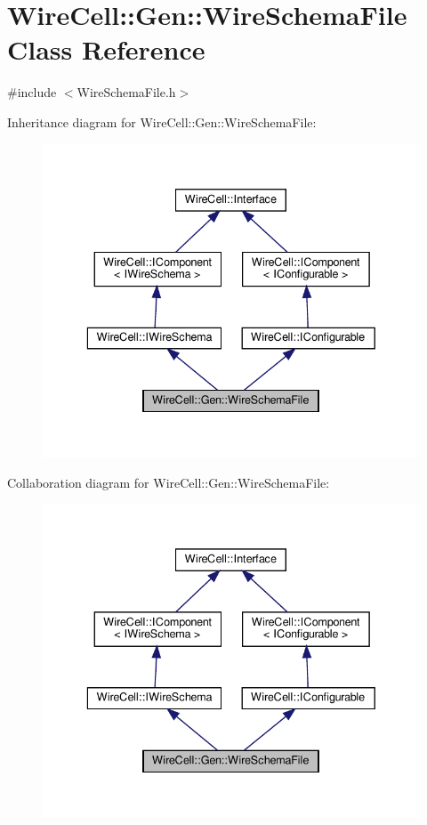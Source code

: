 \hypertarget{class_wire_cell_1_1_gen_1_1_wire_schema_file}{}\section{Wire\+Cell\+:\+:Gen\+:\+:Wire\+Schema\+File Class Reference}
\label{class_wire_cell_1_1_gen_1_1_wire_schema_file}


{\ttfamily \#include $<$Wire\+Schema\+File.\+h$>$}



Inheritance diagram for Wire\+Cell\+:\+:Gen\+:\+:Wire\+Schema\+File\+:
\nopagebreak
\begin{figure}[H]
\begin{center}
\leavevmode
\includegraphics[width=336pt]{class_wire_cell_1_1_gen_1_1_wire_schema_file__inherit__graph}
\end{center}
\end{figure}


Collaboration diagram for Wire\+Cell\+:\+:Gen\+:\+:Wire\+Schema\+File\+:
\nopagebreak
\begin{figure}[H]
\begin{center}
\leavevmode
\includegraphics[width=336pt]{class_wire_cell_1_1_gen_1_1_wire_schema_file__coll__graph}
\end{center}
\end{figure}
